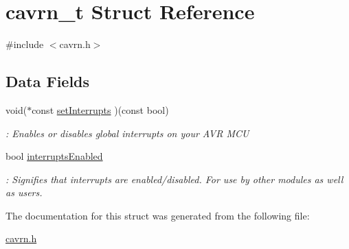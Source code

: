 \hypertarget{a00006}{\section{cavrn\-\_\-t Struct Reference}
\label{a00006}
}


{\ttfamily \#include $<$cavrn.\-h$>$}

\subsection*{Data Fields}
\begin{DoxyCompactItemize}
\item 
void($\ast$const \hyperlink{a00017_ga23b9b26ea99d775a6479518802601749}{set\-Interrupts} )(const bool)
\begin{DoxyCompactList}\small\item\em \-: Enables or disables global interrupts on your A\-V\-R M\-C\-U \end{DoxyCompactList}\item 
bool \hyperlink{a00017_gae49f03dd85f90f1079068562dd37163d}{interrupts\-Enabled}
\begin{DoxyCompactList}\small\item\em \-: Signifies that interrupts are enabled/disabled. For use by other modules as well as users. \end{DoxyCompactList}\end{DoxyCompactItemize}


The documentation for this struct was generated from the following file\-:\begin{DoxyCompactItemize}
\item 
\hyperlink{a00011}{cavrn.\-h}\end{DoxyCompactItemize}
